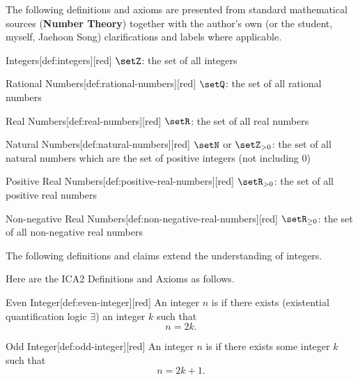 The following definitions and axioms are presented from standard mathematical sources (\textbf{Number Theory}) together with the author's own (or the student, myself, Jaehoon Song) clarifications and labels where applicable.

\begin{define}{Integers}[def:integers][red]
  $\setZ$: the set of all integers
\end{define}

\begin{define}{Rational Numbers}[def:rational-numbers][red]
  $\setQ$: the set of all rational numbers
\end{define}

\begin{define}{Real Numbers}[def:real-numbers][red]
  $\setR$: the set of all real numbers
\end{define}

\begin{define}{Natural Numbers}[def:natural-numbers][red]
  $\setN$ or $\setZ_{>0}$: the set of all natural numbers which are the set of positive integers (not including $0$)
\end{define}

\begin{define}{Positive Real Numbers}[def:positive-real-numbers][red]
  $\setR_{>0}$: the set of all positive real numbers
\end{define}

\begin{define}{Non-negative Real Numbers}[def:non-negative-real-numbers][red]
  $\setR_{\geq 0}$: the set of all non-negative real numbers
\end{define}


\newpage

The following definitions and claims extend the understanding of integers.

Here are the ICA2 Definitions and Axioms as follows.

\begin{define}{Even Integer}[def:even-integer][red]
  An integer $n$ is  if there exists 
  (existential quantification logic $\exists$) an integer $k$ such that
  \[
  n = 2k.
  \]
\end{define}

\begin{define}{Odd Integer}[def:odd-integer][red]
  An integer $n$ is  if 
  there exists some integer $k$ such that
  \[
  n = 2k + 1.
  \]
\end{define}

